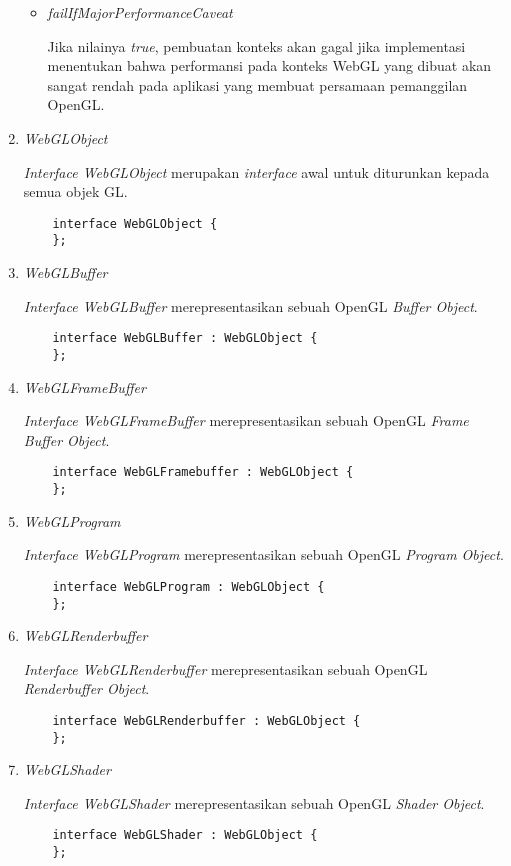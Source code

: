 \begin{enumerate}
\begin{itemize}
	\item {\it failIfMajorPerformanceCaveat}
	
	Jika nilainya {\it true}, pembuatan konteks akan gagal jika implementasi menentukan bahwa performansi pada konteks WebGL yang dibuat akan sangat rendah pada aplikasi yang membuat persamaan pemanggilan OpenGL.
	
	\end{itemize}
	
\item {\it WebGLObject}

	{\it Interface WebGLObject} merupakan {\it interface} awal untuk diturunkan kepada semua objek GL.
	\begin{lstlisting}
	interface WebGLObject {
	};
	\end{lstlisting}
	
\item {\it WebGLBuffer} 
	
	{\it Interface WebGLBuffer} merepresentasikan sebuah OpenGL {\it Buffer Object}.
	\begin{lstlisting}
	interface WebGLBuffer : WebGLObject {
	};
	\end{lstlisting}
	
\item {\it WebGLFrameBuffer}

	{\it Interface WebGLFrameBuffer} merepresentasikan sebuah OpenGL {\it Frame Buffer Object}.
	\begin{lstlisting}
	interface WebGLFramebuffer : WebGLObject {
	};
	\end{lstlisting}

\item {\it WebGLProgram}

	{\it Interface WebGLProgram} merepresentasikan sebuah OpenGL {\it Program Object}.
	\begin{lstlisting}
	interface WebGLProgram : WebGLObject {
	};
	\end{lstlisting}

\item {\it WebGLRenderbuffer}

	{\it Interface WebGLRenderbuffer} merepresentasikan sebuah OpenGL {\it Renderbuffer Object}.
	\begin{lstlisting}
	interface WebGLRenderbuffer : WebGLObject {
	};
	\end{lstlisting}

\item {\it WebGLShader}

	{\it Interface WebGLShader} merepresentasikan sebuah OpenGL {\it Shader Object}.
	\begin{lstlisting}
	interface WebGLShader : WebGLObject {
	};
	\end{lstlisting}


\end{enumerate}

